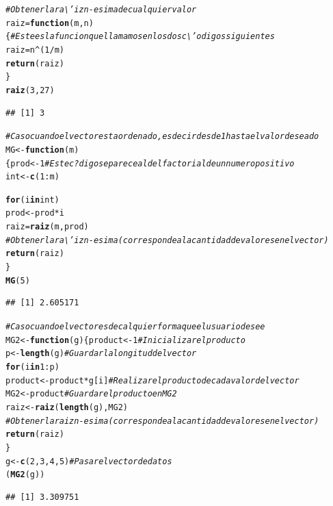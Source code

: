 \documentclass[12pt,letterpaper]{article}\usepackage[]{graphicx}\usepackage[]{color}
\makeatletter
\newcommand{\hlnum}[1]{\textcolor[rgb]{0.686,0.059,0.569}{#1}}%
\newcommand{\hlcom}[1]{\textcolor[rgb]{0.678,0.584,0.686}{\textit{#1}}}%
\newcommand{\hlopt}[1]{\textcolor[rgb]{0,0,0}{#1}}%
\newcommand{\hlstd}[1]{\textcolor[rgb]{0.345,0.345,0.345}{#1}}%
\newcommand{\hlkwa}[1]{\textcolor[rgb]{0.161,0.373,0.58}{\textbf{#1}}}%
\newcommand{\hlkwb}[1]{\textcolor[rgb]{0.69,0.353,0.396}{#1}}%
\newcommand{\hlkwc}[1]{\textcolor[rgb]{0.333,0.667,0.333}{#1}}%
\newcommand{\hlkwd}[1]{\textcolor[rgb]{0.737,0.353,0.396}{\textbf{#1}}}%
\newenvironment{kframe}{%
 \def\at@end@of@kframe{}%
 \ifinner\ifhmode%
  \def\at@end@of@kframe{\end{minipage}}%
  \begin{minipage}{\columnwidth}%
 \fi\fi%
 \def\FrameCommand##1{\hskip\@totalleftmargin \hskip-\fboxsep
 \colorbox{shadecolor}{##1}\hskip-\fboxsep
     \hskip-\linewidth \hskip-\@totalleftmargin \hskip\columnwidth}%
 \MakeFramed {\advance\hsize-\width
   \@totalleftmargin\z@ \linewidth\hsize
   \@setminipage}}%
 {\par\unskip\endMakeFramed%
 \at@end@of@kframe}
\newenvironment{knitrout}{}{} %
\makeatother
\begin{document}
\begin{knitrout}
\color{fgcolor}\begin{kframe}
\begin{alltt}
\hlcom{# Obtener la ra\textbackslash{}'iz n-esima de cualquier valor }
\hlstd{raiz}\hlkwb{=}\hlkwa{function}\hlstd{(}\hlkwc{m}\hlstd{,}\hlkwc{n}\hlstd{)\{} \hlcom{# Este es la funcion que llamamos en los dos c\textbackslash{}'odigos siguientes}
  \hlstd{raiz}\hlkwb{=}\hlstd{n}\hlopt{^}\hlstd{(}\hlnum{1}\hlopt{/}\hlstd{m)}
  \hlkwd{return}\hlstd{(raiz)}
\hlstd{\}}
\hlkwd{raiz}\hlstd{(}\hlnum{3}\hlstd{,}\hlnum{27}\hlstd{)}
\end{alltt}
\begin{verbatim}
## [1] 3
\end{verbatim}
\begin{alltt}
\hlcom{# Caso cuando el vector esta ordenado, es decir desde 1 hasta el valor deseado}
\hlstd{MG}\hlkwb{<-}\hlkwa{function}\hlstd{(}\hlkwc{m}\hlstd{)}
  \hlstd{\{prod}\hlkwb{<-}\hlnum{1} \hlcom{# Este c?digo se parece al del factorial de un numero positivo}
  \hlstd{int}\hlkwb{<-}\hlkwd{c}\hlstd{(}\hlnum{1}\hlopt{:}\hlstd{m)}

  \hlkwa{for}\hlstd{(i} \hlkwa{in} \hlstd{int)}
    \hlstd{prod}\hlkwb{<-}\hlstd{prod} \hlopt{*} \hlstd{i}
  \hlstd{raiz}\hlkwb{=}\hlkwd{raiz}\hlstd{(m,prod)}
  \hlcom{# Obtener la ra\textbackslash{}'iz n-esima (corresponde a la cantidad de valores en el vector)}
  \hlkwd{return}\hlstd{(raiz)}
  \hlstd{\}}
\hlkwd{MG}\hlstd{(}\hlnum{5}\hlstd{)}
\end{alltt}
\begin{verbatim}
## [1] 2.605171
\end{verbatim}
\begin{alltt}
\hlcom{# Caso cuando el vector es de calquier forma que el usuario desee}
\hlstd{MG2}\hlkwb{<-}\hlkwa{function}\hlstd{(}\hlkwc{g}\hlstd{) \{product}\hlkwb{<-}\hlnum{1} \hlcom{# Inicializar el producto}
  \hlstd{p}\hlkwb{<-} \hlkwd{length}\hlstd{(g)} \hlcom{# Guardar la longitud del vector}
  \hlkwa{for}\hlstd{(i} \hlkwa{in} \hlnum{1}\hlopt{:}\hlstd{p)}
    \hlstd{product}\hlkwb{<-}\hlstd{product} \hlopt{*} \hlstd{g[i]} \hlcom{# Realizar el producto de cada valor del vector}
  \hlstd{MG2}\hlkwb{<-}\hlstd{product} \hlcom{# Guardar el producto en MG2}
  \hlstd{raiz}\hlkwb{<-}\hlkwd{raiz}\hlstd{(}\hlkwd{length}\hlstd{(g),MG2)}
  \hlcom{# Obtener la raiz n-esima (corresponde a la cantidad de valores en el vector)}
  \hlkwd{return}\hlstd{(raiz)}
\hlstd{\}}
\hlstd{g}\hlkwb{<-}\hlkwd{c}\hlstd{(}\hlnum{2}\hlstd{,}\hlnum{3}\hlstd{,}\hlnum{4}\hlstd{,}\hlnum{5}\hlstd{)} \hlcom{# Pasar el vector de datos}
\hlstd{(}\hlkwd{MG2}\hlstd{(g))}
\end{alltt}
\begin{verbatim}
## [1] 3.309751
\end{verbatim}
\end{kframe}
\end{knitrout}
\end{document}
